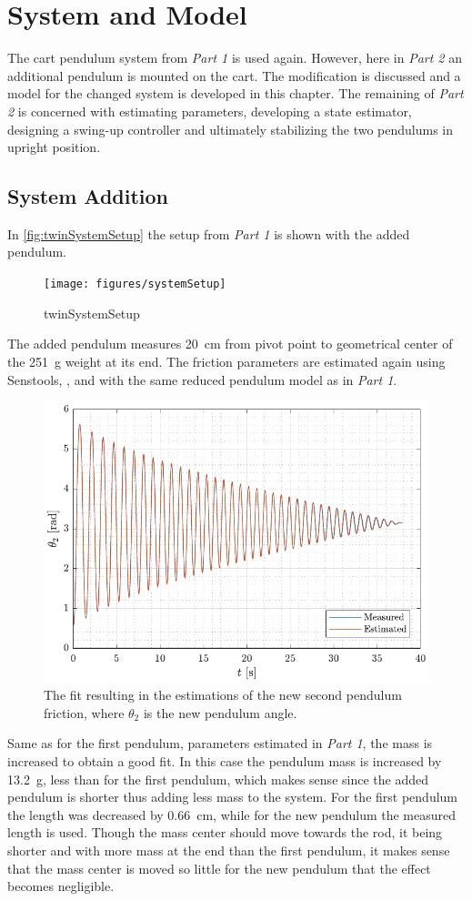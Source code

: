 \chapter{System and Model}
The cart pendulum system from \textit{Part 1} is used again. However, here in \textit{Part 2} an additional pendulum is mounted on the cart. The modification is discussed and a model for the changed system is developed in this chapter. The remaining of \textit{Part 2} is concerned with estimating parameters, developing a state estimator, designing a swing-up controller and ultimately stabilizing the two pendulums in upright position.

\section{System Addition}
In \autoref{fig:twinSystemSetup} the setup from \textit{Part 1} is shown with the added pendulum.
%
\begin{figure}[H]
  \texttt{[image: figures/systemSetup]}
  \caption{twinSystemSetup}
  \label{fig:twinSystemSetup}
\end{figure}
%
The added pendulum measures \SI{20}{cm} from pivot point to geometrical center of the \SI{251}{g} weight at its end. The friction parameters are estimated again using Senstools, \cite{MHKnudsen}, and with the same reduced pendulum model as in \textit{Part 1}.
%
\begin{figure}[H]
  \includegraphics[width=.7\textwidth]{figures/pendulum2Est}
  \caption{The fit resulting in the estimations of the new second pendulum friction, where $\theta_2$ is the new pendulum angle.}
  \label{fig:pendulum2Est}
\end{figure}
%
Same as for the first pendulum, parameters estimated in \textit{Part 1}, the mass is increased to obtain a good fit. In this case the pendulum mass is increased by \SI{13.2}{g}, less than for the first pendulum, which makes sense since the added pendulum is shorter thus adding less mass to the system. For the first pendulum the length was decreased by \SI{0.66}{cm}, while for the new pendulum the measured length is used. Though the mass center should move towards the rod, it being shorter and with more mass at the end than the first pendulum, it makes sense that the mass center is moved so little for the new pendulum that the effect becomes negligible.

